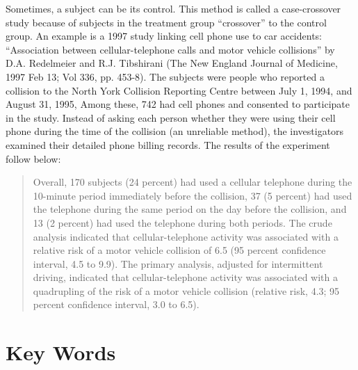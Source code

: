 \documentclass[11pt, chapterprefix=true]{scrbook}\usepackage[]{graphicx}\usepackage[]{color}
\begin{document}
Sometimes, a subject can be its control.  This method is called a case-crossover study because of subjects in the treatment group ``crossover'' to the control group.  An example is a 1997 study linking cell phone use to car accidents: ``Association between cellular-telephone calls and motor vehicle collisions'' by D.A. Redelmeier and R.J. Tibshirani (The New England Journal of Medicine, 1997 Feb 13; Vol 336, pp. 453-8).  The subjects were people who reported a collision to the North York Collision Reporting Centre between July 1, 1994, and August 31, 1995, Among these, 742 had cell phones and consented to participate in the study.  Instead of asking each person whether they were using their cell phone during the time of the collision (an unreliable method), the investigators examined their detailed phone billing records.  The results of the experiment follow below:

\begin{quotation}
Overall, 170 subjects (24 percent) had used a cellular telephone during the 10-minute period immediately before the collision, 37 (5 percent) had used the telephone during the same period on the day before the collision, and 13 (2 percent) had used the telephone during both periods. The crude analysis indicated that cellular-telephone activity was associated with a relative risk of a motor vehicle collision of 6.5 (95 percent confidence interval, 4.5 to 9.9).  The primary analysis, adjusted for intermittent driving, indicated that cellular-telephone activity was associated with a quadrupling of the risk of a motor vehicle collision (relative risk, 4.3; 95 percent confidence interval, 3.0 to 6.5).
\end{quotation}  \citep{redelmeier1997}

\section{Key Words}

\end{document}
